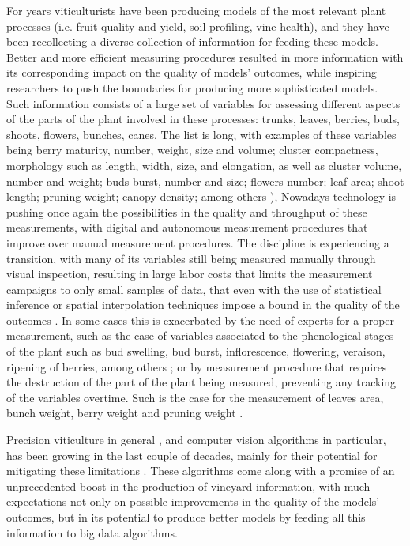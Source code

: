 \documentclass[a4paper,authoryear,review]{elsarticle}
\begin{document}
%
For years viticulturists have been producing models of the most relevant plant processes (i.e. fruit quality and yield, soil profiling, vine health), and they have been recollecting a diverse collection of information for feeding these models. Better and more efficient measuring procedures resulted in more information with its corresponding impact on the quality of models’ outcomes, while inspiring researchers to push the boundaries for producing more sophisticated models. Such information consists of a large set of variables for assessing different aspects of the parts of the plant involved in these processes: trunks, leaves, berries, buds, shoots, flowers, bunches, canes. The list is long, with examples of these variables being berry maturity, number, weight, size and volume; cluster compactness, morphology such as length, width, size, and elongation, as well as cluster volume, number and weight; buds burst, number and size; flowers number; leaf area; shoot length; pruning weight; canopy density; among others \citep{awriNDmanual1, awriNDmanual3}),
%
Nowadays technology is pushing once again the possibilities in the quality and throughput of these measurements, with digital and autonomous measurement procedures that improve over manual measurement procedures. The discipline is experiencing a transition, with many of its variables still being measured manually through visual inspection, resulting in large labor costs that limits the measurement campaigns to only small samples of data, that even with the use of statistical inference or spatial interpolation techniques impose a bound in the quality of the outcomes \citep{whelan1996spatial}. 
%
In some cases this is exacerbated by the need of experts for a proper measurement, such as the case of variables associated to the phenological stages of the plant such as bud swelling, bud burst, inflorescence, flowering, veraison, ripening of berries, among others \citep{lorenz1995growth}; or by measurement procedure that requires the destruction of the part of the plant being measured, preventing any tracking of the variables overtime. Such is the case for the measurement of leaves area, bunch weight, berry weight and pruning weight \citep{kliewer2005leaf}. 

%
Precision viticulture in general \citep{bramley2009lessons}, and computer vision algorithms in particular, has been growing in the last couple of decades, mainly for their potential for mitigating these limitations \citep{seng2018computer, matese2015technology}. These algorithms come along with a promise of an unprecedented boost in the production of vineyard information, with much expectations not only on possible improvements in the quality of the models’ outcomes, but in its potential to produce better models by feeding all this information to big data algorithms. 
\end{document}
